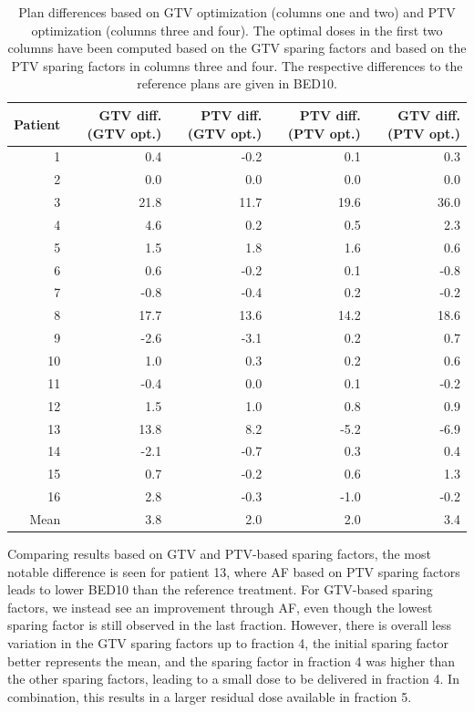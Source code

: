 \documentclass[11pt]{article}
\newcommand{\toprule}{\hline}
\newcommand{\midrule}{\hline}
\newcommand{\bottomrule}{\hline}
\begin{document}
\begin{table}[ht]
\centering
\caption{Plan differences based on GTV optimization (columns one and two) and PTV optimization (columns three and four). The optimal doses in the first two columns have been computed based on the GTV sparing factors and based on the PTV sparing factors in columns three and four. The respective differences to the reference plans are given in BED10.}
\label{tab:gtv-ptv}
\begin{tabular}{rrrrr}
\toprule
Patient & GTV diff. (GTV opt.) & PTV diff. (GTV opt.) & PTV diff. (PTV opt.) & GTV diff. (PTV opt.) \\
\midrule
1 & 0.4 & -0.2 & 0.1 & 0.3 \\
2 & 0.0 & 0.0 & 0.0 & 0.0 \\
3 & 21.8 & 11.7 & 19.6 & 36.0 \\
4 & 4.6 & 0.2 & 0.5 & 2.3 \\
5 & 1.5 & 1.8 & 1.6 & 0.6 \\
6 & 0.6 & -0.2 & 0.1 & -0.8 \\
7 & -0.8 & -0.4 & 0.2 & -0.2 \\
8 & 17.7 & 13.6 & 14.2 & 18.6 \\
9 & -2.6 & -3.1 & 0.2 & 0.7 \\
10 & 1.0 & 0.3 & 0.2 & 0.6 \\
11 & -0.4 & 0.0 & 0.1 & -0.2 \\
12 & 1.5 & 1.0 & 0.8 & 0.9 \\
13 & 13.8 & 8.2 & -5.2 & -6.9 \\
14 & -2.1 & -0.7 & 0.3 & 0.4 \\
15 & 0.7 & -0.2 & 0.6 & 1.3 \\
16 & 2.8 & -0.3 & -1.0 & -0.2 \\
Mean & 3.8 & 2.0 & 2.0 & 3.4 \\
\bottomrule
\end{tabular}
\end{table}

Comparing results based on GTV and PTV-based sparing factors, the most notable difference is seen for patient 13, where AF based on PTV sparing factors leads to lower BED10 than the reference treatment. For GTV-based sparing factors, we instead see an improvement through AF, even though the lowest sparing factor is still observed in the last fraction. However, there is overall less variation in the GTV sparing factors up to fraction 4, the initial sparing factor better represents the mean, and the sparing factor in fraction 4 was higher than the other sparing factors, leading to a small dose to be delivered in fraction 4. In combination, this results in a larger residual dose available in fraction 5.
\end{document}
